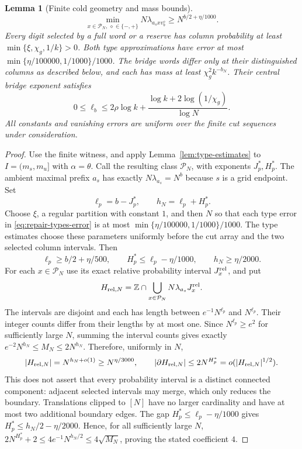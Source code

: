 \documentclass[11pt]{article}
\numberwithin{equation}{section}
\newtheorem{lemma}[theorem]{Lemma}
\theoremstyle{definition}
\theoremstyle{remark}
\newcommand{\1}{\mathbf 1}
\begin{document}
\begin{lemma}[Finite cold geometry and mass bounds]
\begin{equation}
\label{eq:cold-reserve-means}
 \min_{x\in\mathcal P_N,\,\diamond\in\{-,+\}}
       N\lambda_{a_sxv_b^\diamond}\ge N^{b/2+\eta/1000}.
\end{equation}
Every digit selected by a full word or a reserve has column probability
at least $\min\{\xi,\chi_g,1/k\}>0$. Both type approximations have error at most $\min\{\eta/100000,1/1000\}/1000$. The bridge words differ only at their distinguished columns as described below, and each has mass at least $\chi_g^2k^{-b_N}$. Their central bridge exponent satisfies
\[
 0\le\ell_b\le2\rho\log k+
 \frac{\log k+2\log(1/\chi_g)}{\log N}.
\]
All constants and vanishing errors are uniform
over the finite cut sequences under consideration.
\end{lemma}

\begin{proof}

Use the finite witness, and apply Lemma~\ref{lem:type-estimates} to
$I=(m_s,m_u]$ with $\alpha=\theta$.
Call the resulting class $\mathcal P_N$, with exponents $J_p^*,H_p^*$.
The ambient maximal prefix $a_s$ has exactly
$N\lambda_{a_s}=N^b$ because $s$ is a grid endpoint.
Set
\[
 \ell_p=b-J_p^*,\qquad h_N=\ell_p+H_p^*.
\]
Choose $\xi$, a regular partition with constant $1$, and then $N$ so that each type error in \eqref{eq:repair-types-error} is at most $\min\{\eta/100000,1/1000\}/1000$. The type estimates choose these parameters uniformly before the cut array and the two selected column intervals.
Then
\begin{equation}\label{eq:repair-finite-geometric-buffers}
 \ell_p\ge b/2+\eta/500,\qquad
 H_p^*\le\ell_p-\eta/1000,\qquad h_N\ge\eta/2000.
\end{equation}
For each $x\in\mathcal P_N$ use its exact relative probability interval
$J_x^{\rm rel}$, and put
\[
 H_{{\rm rel},N}=\mathbb Z\cap\bigcup_{x\in\mathcal P_N}
                         N\lambda_{a_s}J_x^{\rm rel}.
\]
The intervals are disjoint and each has length between
$e^{-1}N^{\ell_p}$ and $N^{\ell_p}$.  Their integer counts differ from their
lengths by at most one. Since $N^{\ell_p}\ge e^2$ for sufficiently large $N$, summing the interval counts gives exactly $e^{-2}N^{h_N}\le M_N\le2N^{h_N}$. Therefore, uniformly in $N$,
\[
 |H_{{\rm rel},N}|=N^{h_N+o(1)}\ge N^{\eta/3000},\qquad
 |\partial H_{{\rm rel},N}|\le2N^{H_p^*}
                         =o(|H_{{\rm rel},N}|^{1/2}).
\]
This does not assert that every probability interval is a distinct connected
component: adjacent selected intervals may merge, which only reduces the
boundary.  Translations clipped to $[N]$ have no larger cardinality and
have at most two additional boundary edges. The gap $H_p^*\le\ell_p-\eta/1000$ gives $H_p^*\le h_N/2-\eta/2000$. Hence, for all sufficiently large $N$, $2N^{H_p^*}+2\le4e^{-1}N^{h_N/2}\le4\sqrt{M_N}$, proving the stated coefficient $4$.


\end{proof}
\end{document}
